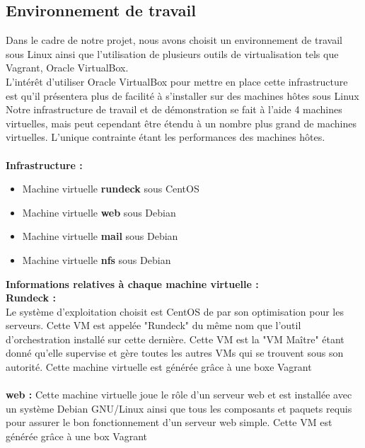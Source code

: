 \documentclass[12pt]{article}
\begin{document}
\subsection{Environnement de travail}
Dans le cadre de notre projet, nous avons choisit un environnement de travail sous Linux ainsi que l'utilisation de plusieurs outils de virtualisation tels que Vagrant, Oracle VirtualBox.
\\
L'intérêt d'utiliser Oracle VirtualBox pour mettre en place cette infrastructure est qu'il présentera plus de facilité à s'installer sur des machines hôtes sous Linux
\\
Notre infrastructure de travail et de démonstration se fait à l'aide 4 machines virtuelles, mais peut cependant être étendu à un nombre plus grand de machines virtuelles. L'unique contrainte étant les performances des machines hôtes.
\\
\vspace{0.5cm}
\\
\textbf{Infrastructure :}
\begin{itemize}
    \item Machine virtuelle \textbf{rundeck} sous CentOS
    \item Machine virtuelle \textbf{web} sous Debian
    \item Machine virtuelle \textbf{mail} sous Debian
    \item Machine virtuelle \textbf{nfs} sous Debian
\end{itemize}
\vspace{0.5cm}
\textbf{Informations relatives à chaque machine virtuelle :}
\vspace{0.5cm}
\\
\textbf{Rundeck :} 
\\
Le système d'exploitation choisit est CentOS de par son optimisation pour les serveurs. Cette VM est appelée "Rundeck" du même nom que l'outil d'orchestration installé sur cette dernière. Cette VM est la "VM Maître" étant donné qu'elle supervise et gère toutes les autres VMs qui se trouvent sous son autorité. Cette machine virtuelle est générée grâce à une boxe Vagrant 
\\
\vspace{0.5cm}
\\
\textbf{web :}
Cette machine virtuelle joue le rôle d'un serveur web et est installée avec un système Debian GNU/Linux ainsi que tous les composants et paquets requis pour assurer le bon fonctionnement d'un serveur web simple. Cette VM est générée grâce à une box Vagrant 
\\
\end{document}
